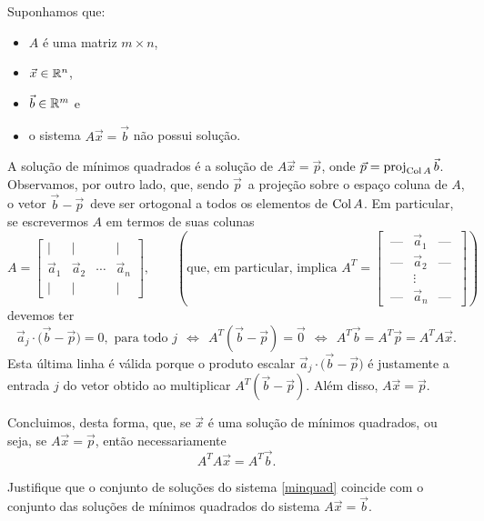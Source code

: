 \documentclass[../livro.tex]{subfiles}  %
\begin{document}
Suponhamos que:
\begin{itemize}
\item $A$ é uma matriz $m \times n$,
\item $\vec{x} \in \mathbb{R}^n$,
\item $\vec{b} \in \mathbb{R}^m$ e
\item o sistema $A \vec{x} = \vec{b}$ não possui solução.
\end{itemize} A solução de mínimos quadrados é a solução de $A \vec{x} = \vec{p}$, onde $\vec{p} = \operatorname{proj}_{\operatorname{Col} A} \vec{b}$. Observamos, por outro lado, que, sendo $\vec{p}\,$ a projeção sobre o espaço coluna de $A$, o vetor $\vec{b} - \vec{p}\,$ deve ser ortogonal a todos os elementos de $\operatorname{Col} A$. Em particular, se escrevermos $A$ em termos de suas colunas
\[
A =
\begin{bmatrix}
  | & | &   & | \\
  \vec{a}_1 & \vec{a}_2 & \cdots  & \vec{a}_n \\
  | & | &   & |
\end{bmatrix}, \qquad \left( \text{que,  em particular, implica }
  A^T = \begin{bmatrix}
    \ \text{---} & \vec{a}_1  & \text{---} \ \\
    \ \text{---} & \vec{a}_2  & \text{---} \ \\
    \ & \vdots     &  \ \\
    \ \text{---} & \vec{a}_n  & \text{---}\ 
  \end{bmatrix}\right)
\] devemos ter
\[
\vec{a}_j \cdot \big(\vec{b} - \vec{p}\big) = 0, \text{ para todo } j  \ \  \iff \ \
A^T (\vec{b} - \vec{p}) = \vec{0} \ \ \iff \ \ A^T \vec{b} = A^T \vec{p} = A^T A\vec{x}.
\] Esta última linha é válida porque o produto escalar $\vec{a}_j \cdot \big(\vec{b} - \vec{p}\big)$ é justamente a entrada $j$ do vetor obtido ao multiplicar $A^T(\vec{b} - \vec{p})$. Além disso, $A \vec{x} = \vec{p}.$

Concluimos, desta forma, que, se $\vec{x}$ é uma solução de mínimos quadrados, ou seja, se $A \vec{x} = \vec{p}$, então necessariamente
\begin{equation}\label{minquad}
  \boxed{A^T A\vec{x} = A^T \vec{b}.}
\end{equation}

\begin{exercise}[Teórico]
  Justifique que o conjunto de soluções do sistema \eqref{minquad} coincide com o conjunto das soluções de mínimos quadrados do sistema $A \vec{x} = \vec{b}$.
\end{exercise}
\end{document}

